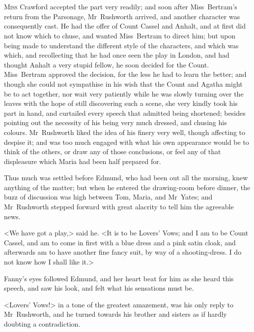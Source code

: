 \chapter[Chapter \thechapter]{} 

 \lettrine[lraise=0.3]{M}{iss} Crawford accepted the part very readily; and soon after Miss~Bertram's return from the Parsonage, Mr~Rushworth arrived, and another character was consequently cast. He had the offer of Count Cassel and Anhalt, and at first did not know which to chuse, and wanted Miss~Bertram to direct him; but upon being made to understand the different style of the characters, and which was which, and recollecting that he had once seen the play in London, and had thought Anhalt a very stupid fellow, he soon decided for the Count. Miss~Bertram approved the decision, for the less he had to learn the better; and though she could not sympathise in his wish that the Count and Agatha might be to act together, nor wait very patiently while he was slowly turning over the leaves with the hope of still discovering such a scene, she very kindly took his part in hand, and curtailed every speech that admitted being shortened; besides pointing out the necessity of his being very much dressed, and chusing his colours. Mr~Rushworth liked the idea of his finery very well, though affecting to despise it; and was too much engaged with what his own appearance would be to think of the others, or draw any of those conclusions, or feel any of that displeasure which Maria had been half prepared for.

Thus much was settled before Edmund, who had been out all the morning, knew anything of the matter; but when he entered the drawing-room before dinner, the buzz of discussion was high between Tom, Maria, and Mr~Yates; and Mr~Rushworth stepped forward with great alacrity to tell him the agreeable news.

<We have got a play,> said he. <It is to be Lovers' Vows; and I am to be Count Cassel, and am to come in first with a blue dress and a pink satin cloak, and afterwards am to have another fine fancy suit, by way of a shooting-dress. I do not know how I shall like it.>

Fanny's eyes followed Edmund, and her heart beat for him as she heard this speech, and saw his look, and felt what his sensations must be.

<Lovers' Vows!> in a tone of the greatest amazement, was his only reply to Mr~Rushworth, and he turned towards his brother and sisters as if hardly doubting a contradiction.

